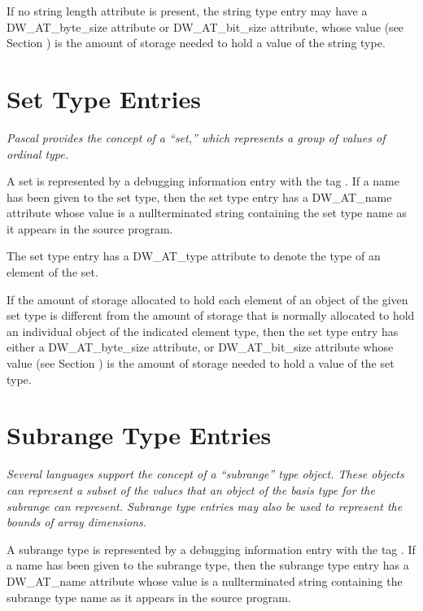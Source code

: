 If no string length attribute is present, the string type
entry may have a DW\_AT\_byte\_size attribute or DW\_AT\_bit\_size
attribute, whose value 
(see Section ) 
is the amount of
storage needed to hold a value of the string type.


\section{Set Type Entries}
\label{chap:settypeentries}

\textit{Pascal provides the concept of a “set,” which represents
a group of values of ordinal type.}

A set is represented by a debugging information entry with
the tag . 
If a name has been given to the
set type, then the set type entry has a DW\_AT\_name attribute
whose value is a null\dash terminated string containing the
set type name as it appears in the source program.

The set type entry has a DW\_AT\_type attribute to denote the
type of an element of the set.

If the amount of storage allocated to hold each element of an
object of the given set type is different from the amount of
storage that is normally allocated to hold an individual object
of the indicated element type, then the set type entry has
either a DW\_AT\_byte\_size attribute, or DW\_AT\_bit\_size attribute
whose value (see Section ) is
the amount of storage needed to hold a value of the set type.


\section{Subrange Type Entries}
\label{chap:subrangetypeentries}

\textit{Several languages support the concept of a ``subrange''
type object. These objects can represent a subset of the
values that an object of the basis type for the subrange can
represent. Subrange type entries may also be used to represent
the bounds of array dimensions.}

A subrange type is represented by a debugging information
entry with the 
tag . 
If a name has been
given to the subrange type, then the subrange type entry
has a DW\_AT\_name attribute whose value is a null\dash terminated
string containing the subrange type name as it appears in
the source program.

